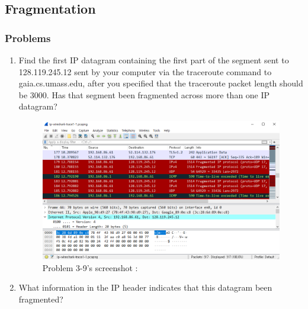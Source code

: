 \subsection{Fragmentation}
    \subsubsection*{Problems}
    \begin{enumerate}[label=\bfseries Problem \arabic*:,leftmargin=*,labelindent=1em]
    \addtocounter{enumi}{8}
        \item Find the first IP datagram containing the first part of the segment sent to 128.119.245.12 sent by your computer via the traceroute command to gaia.cs.umass.edu, after you specified that the traceroute packet length should be 3000. Has that segment been fragmented across more than one IP datagram?\\[0.2mm]
        \soln
        \begin{figure}[!h]\centering
        \hspace{15mm}  
    		\includegraphics[width=.85\textwidth]{image/week02/3-9-1.png}
    		\caption{\footnotesize Problem 3-9's screenshot : }
    		\vspace{-10pt}
        \end{figure}
        \item What information in the IP header indicates that this datagram been fragmented? \\[0.2mm]
        \soln
        \begin{figure}[!h]\centering

\end{figure}
\end{enumerate}
